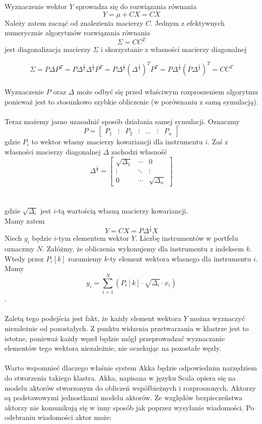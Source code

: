 \documentclass[11pt,titlepage]{article}
\begin{document}
Wyznaczenie wektor $Y$ sprowadza się do rozwiązania równania
$$Y = \mu + CX = CX $$
Należy zatem zacząć od znalezienia macierzy $C$. Jednym z efektywnych numerycznie algorytmów rozwiązania równania
$$\Sigma = CC^T $$
jest diagonalizacja macierzy $\Sigma$ i skorzystanie z własności macierzy diagonalnej 

$$ \Sigma =  P \Delta P^T = P \Delta^{\frac{1}{2}} \Delta^{\frac{1}{2}}P^T=P \Delta^{\frac{1}{2}} (\Delta^{\frac{1}{2}})^T P^T=P \Delta^{\frac{1}{2}} (P \Delta^{\frac{1}{2}})^T=CC^T $$\\

Wyznaczenie $P$ oraz $\Delta$ może odbyć się przed właściwym rozproszeniem algorytmu ponieważ jest to stosunkowo szybkie obliczenie (w porównaniu z samą symulacją).\\
\\
Teraz możemy jasno uzasadnić sposób działania samej symulacji. Oznaczmy 
$$ P=\begin{bmatrix} P_1 & \vdots & P_2 & \vdots  & \hdots & \vdots & P_n \end{bmatrix} $$
gdzie $P_i$ to wektor własny macierzy kowariancji dla instrumentu $i$. Zaś z własności macierzy diagonalnej $\Delta$ zachodzi własność
$$\Delta^{\frac{1}{2}}=\begin{bmatrix} \sqrt{\Delta_1} &  \cdots &0 \\  \vdots & \ddots  & \vdots \\ 0& \cdots & \sqrt{\Delta_n} \end{bmatrix}$$\\
\\
gdzie $\sqrt{\Delta_i}$ jest $i$-tą wartością własną macierzy kowariancji.\\
Mamy zatem 
$$Y = CX = P \Delta ^ {\frac{1}{2}} X$$
Niech $y_i$ będzie $i$-tym elementem wektor $Y$. Liczbę instrumentów w portfelu oznaczmy $N$. Załóżmy, że obliczenia wykonujemy dla instrumentu z indeksem $k$.\\
Wtedy przez $P_i[k]$ rozumiemy $k$-ty element wektora własnego dla instrumentu $i$. Mamy
$$y_i=\sum_{i=1}^{N}(P_i[k]\cdot\sqrt{\Delta_i}\cdot x_i)$$.\\
\\
Zaletą tego podejścia jest fakt, że każdy element wektora $Y$ można wyznaczyć niezależnie od pozostałych. Z punktu widzenia przetwarzania w klastrze jest to istotne, ponieważ każdy węzeł będzie mógł przeprowadzać wyznaczanie elementów tego wektora niezależnie, nie oczekując na pozostałe węzły.\\
\\
Warto wspomnieć dlaczego właśnie system Akka będzie odpowiednim narzędziem do stworzenia takiego klastra. Akka, napisana w języku Scala opiera się na modelu aktorów stworzonym do obliczeń współbieżnych i rozproszonych. Aktorzy są podstawowymi jednostkami modelu aktorów. Ze względów bezpieczeństwa aktorzy nie komunikują się w inny sposób jak poprzez wysyłanie wiadomości. Po odebraniu wiadomości aktor może:
\end{document}
